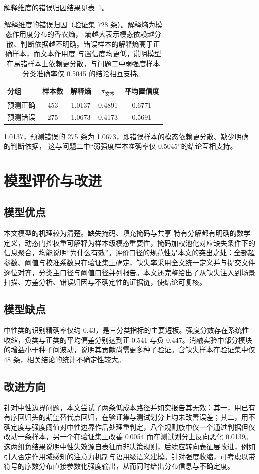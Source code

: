 \documentclass[withoutpreface,bwprint]{cumcmthesis}
\begin{document}
解释维度的错误归因结果见表~\ref{tab:q3err}。

\begin{table}[H]
\centering
  \caption{解释维度的错误归因（验证集 728 条）。解释熵为模态作用度分布的香农熵，
  熵越大表示模态依赖越分散、判断依据越不明确。错误样本的解释熵高于正确样本，而文本作用度
  与置信度均更低，说明模型在易错样本上依赖更分散，与问题二中弱强度样本分类准确率仅 0.5045
  的结论相互支持。}
\label{tab:q3err}
\begin{tabular}{lcccc}
\toprule
分组 & 样本数 & 解释熵 & $\pi_{\text{文本}}$ & 平均置信度 \\
\midrule
预测正确 & 453 & 1.0137 & 0.4891 & 0.6771 \\
预测错误 & 275 & 1.0673 & 0.4173 & 0.5691 \\
\bottomrule
\end{tabular}
\end{table}
1.0137，预测错误的 275 条为 1.0673，即错误样本的模态依赖更分散、缺少明确的判断依据，
这与问题二中“弱强度样本准确率仅 0.5045”的结论互相支持。
\section{模型评价与改进}
\subsection{模型优点}
本文模型的机理较为清楚。缺失掩码、填充掩码与共享-特有分解都有明确的数学定义，动态门控权重可解释为样本级模态重要性，掩码加权池化对应缺失条件下的信息聚合，均能说明“为什么有效”。评价口径的规范性是本文的突出之处：全部超参数、阈值与校准系数只在验证集上确定，缺失率采用全文统一定义并与提交文件逐位对齐，分类主口径与阈值口径并列报告。本文还完整给出了从缺失注入到场景扫描、方差分析、错误归因与不确定性的证据链，使结论可复核。

\subsection{模型缺点}
中性类的识别精确率仅约 0.43，是三分类指标的主要短板。强度分数存在系统性收缩，负类与正类的平均偏差分别达到正 0.541 与负 0.447。消融实验中部分模块的增益小于种子间波动，说明其贡献尚需更多种子验证。含缺失样本在验证集中仅 48 条，相关结论的统计不确定性较大。

\subsection{改进方向}
针对中性边界问题，本文尝试了两条低成本路径并如实报告其无效：其一，用已有有序回归头的期望替代点回归，在验证集与测试划分上均未改善误差；其二，用不确定度与强度阈值对中性边界作后处理重判定，八个规则族中仅一个通过判据但仅改动一条样本，另一个在验证集上改善 0.0054 而在测试划分上反向恶化 0.0139。这两组负结果说明中性失效源自表征而非决策规则，后续应转向表征层改进，例如引入否定作用域感知的注意力机制与语用级语义建模。针对强度收缩，可考虑以带符号的序数分布直接参数化强度输出，从而同时给出分布信息与不确定度。
\end{document}
